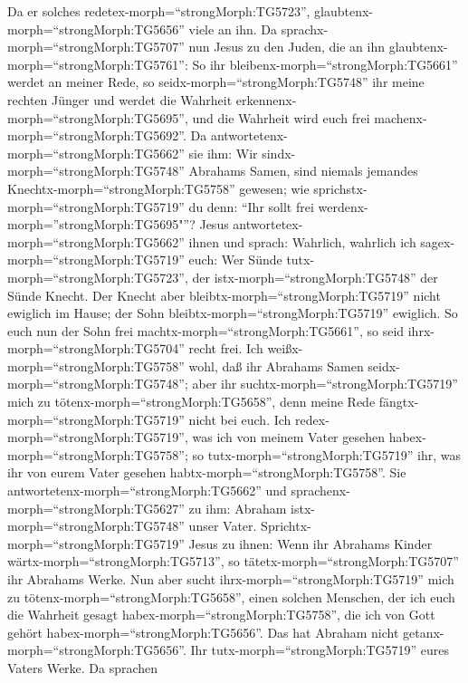  Da er solches redetex-morph=``strongMorph:TG5723'',
glaubtenx-morph=``strongMorph:TG5656'' viele an ihn.  Da
sprachx-morph=``strongMorph:TG5707'' nun Jesus zu den Juden, die an ihn
glaubtenx-morph=``strongMorph:TG5761'': So ihr
bleibenx-morph=``strongMorph:TG5661'' werdet an meiner Rede, so
seidx-morph=``strongMorph:TG5748'' ihr meine rechten Jünger
 und werdet die Wahrheit
erkennenx-morph=``strongMorph:TG5695'', und die Wahrheit wird euch frei
machenx-morph=``strongMorph:TG5692''.  Da
antwortetenx-morph=``strongMorph:TG5662'' sie ihm: Wir
sindx-morph=``strongMorph:TG5748'' Abrahams Samen, sind niemals jemandes
Knechtx-morph=``strongMorph:TG5758'' gewesen; wie
sprichstx-morph=``strongMorph:TG5719'' du denn: ``Ihr sollt frei
werdenx-morph=''strongMorph:TG5695"''?  Jesus
antwortetex-morph=``strongMorph:TG5662'' ihnen und sprach: Wahrlich,
wahrlich ich sagex-morph=``strongMorph:TG5719'' euch: Wer Sünde
tutx-morph=``strongMorph:TG5723'', der istx-morph=``strongMorph:TG5748''
der Sünde Knecht.  Der Knecht aber
bleibtx-morph=``strongMorph:TG5719'' nicht ewiglich im Hause; der Sohn
bleibtx-morph=``strongMorph:TG5719'' ewiglich.  So euch nun
der Sohn frei machtx-morph=``strongMorph:TG5661'', so seid
ihrx-morph=``strongMorph:TG5704'' recht frei.  Ich
weißx-morph=``strongMorph:TG5758'' wohl, daß ihr Abrahams Samen
seidx-morph=``strongMorph:TG5748''; aber ihr
suchtx-morph=``strongMorph:TG5719'' mich zu
tötenx-morph=``strongMorph:TG5658'', denn meine Rede
fängtx-morph=``strongMorph:TG5719'' nicht bei euch.  Ich
redex-morph=``strongMorph:TG5719'', was ich von meinem Vater gesehen
habex-morph=``strongMorph:TG5758''; so tutx-morph=``strongMorph:TG5719''
ihr, was ihr von eurem Vater gesehen habtx-morph=``strongMorph:TG5758''.
 Sie antwortetenx-morph=``strongMorph:TG5662'' und
sprachenx-morph=``strongMorph:TG5627'' zu ihm: Abraham
istx-morph=``strongMorph:TG5748'' unser Vater.
Sprichtx-morph=``strongMorph:TG5719'' Jesus zu ihnen: Wenn ihr Abrahams
Kinder wärtx-morph=``strongMorph:TG5713'', so
tätetx-morph=``strongMorph:TG5707'' ihr Abrahams Werke. 
Nun aber sucht ihrx-morph=``strongMorph:TG5719'' mich zu
tötenx-morph=``strongMorph:TG5658'', einen solchen Menschen, der ich
euch die Wahrheit gesagt habex-morph=``strongMorph:TG5758'', die ich von
Gott gehört habex-morph=``strongMorph:TG5656''. Das hat Abraham nicht
getanx-morph=``strongMorph:TG5656''.  Ihr
tutx-morph=``strongMorph:TG5719'' eures Vaters Werke. Da sprachen
